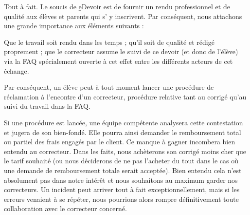 ﻿Tout à fait. Le soucis de \b{eDevoir} est de fournir un rendu professionnel et de qualité aux élèves et parents qui s' y inscrivent. Par conséquent, nous attachons une grande importance aux éléments suivants :
\begin{itemize}
	\li Que le travail soit rendu dans les temps ;
	\li qu'il soit de qualité et rédigé proprement ;
	\li que le correcteur assume le suivi de ce devoir (et donc de l'élève) via la FAQ spécialement ouverte à cet effet entre les différents acteurs de cet échange.
\end{itemize}

Par conséquent, un élève peut à tout moment lancer une procédure de réclamation à l'encontre d'un correcteur, procédure relative tant au corrigé qu'au suivi du travail dans la FAQ.

Si une procédure est lancée, une équipe compétente analysera cette contestation et jugera de son bien-fondé. Elle pourra ainsi demander le remboursement total ou partiel des frais engagés par le client. Ce manque à gagner incombera bien entendu au correcteur. Dans les faits, nous achèterons son corrigé moins cher que le tarif souhaité (ou nous déciderons de ne pas l'acheter du tout dans le cas où une demande de remboursement totale serait acceptée). Bien entendu cela n'est absolument pas dans notre intérêt et nous souhaitons au maximum garder nos correcteurs. Un incident peut arriver tout à fait exceptionnellement, mais si les erreurs venaient à se répéter, nous pourrions alors rompre définitivement toute collaboration avec le correcteur concerné.